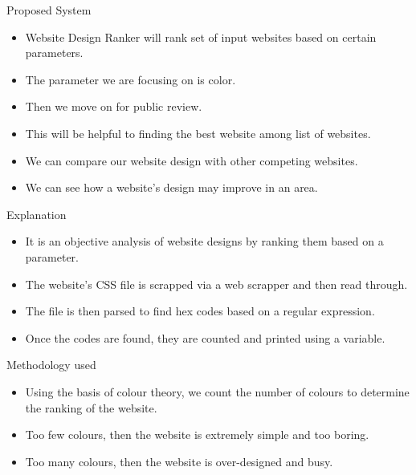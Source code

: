 \documentclass[11pt]{beamer}
\begin{document}
	\begin{frame}{Proposed System}
			\begin{itemize}
			\item Website Design Ranker will rank set of input websites based on certain parameters.
			\item The parameter we are focusing on is color.
			\item Then we move on for public review.
			\item This will be helpful to finding the best website among list of websites.
			\item We can compare our website design with other competing websites.
			\item We can see how a website's design may improve in an area.

			\end{itemize}
	\end{frame}
	\begin{frame}{Explanation }
		\begin{itemize}
			\item It is an objective analysis of website designs by ranking them based on a parameter.
			\item The website's CSS file is scrapped via a web scrapper and then read through.
			\item The file is then parsed to find hex codes based on a regular expression.
			\item Once the codes are found, they are counted and printed using a variable.
		\end{itemize}
	\end{frame}
		\begin{frame}{Methodology used}
	\begin{itemize}
		\item Using the basis of colour theory, we count the number of colours to determine the ranking of the website.
		\item Too few colours, then the website is extremely simple and too boring.
		\item Too many colours, then the website is over-designed and busy. 
	\end{itemize}
	\end{frame}
\end{document}
